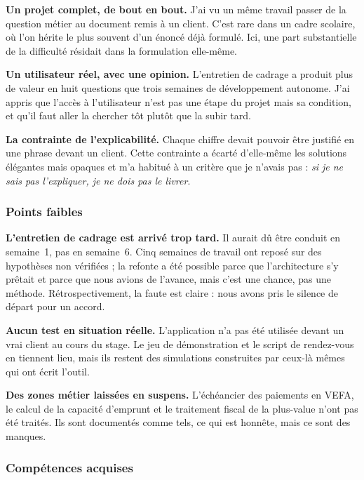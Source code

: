 \documentclass[12pt,a4paper]{article}
\begin{document}
\textbf{Un projet complet, de bout en bout.} J'ai vu un même travail passer de la
question métier au document remis à un client. C'est rare dans un cadre
scolaire, où l'on hérite le plus souvent d'un énoncé déjà formulé. Ici, une part
substantielle de la difficulté résidait dans la formulation elle-même.

\textbf{Un utilisateur réel, avec une opinion.} L'entretien de cadrage a produit
plus de valeur en huit questions que trois semaines de développement autonome.
J'ai appris que l'accès à l'utilisateur n'est pas une étape du projet mais sa
condition, et qu'il faut aller la chercher tôt plutôt que la subir tard.

\textbf{La contrainte de l'explicabilité.} Chaque chiffre devait pouvoir être
justifié en une phrase devant un client. Cette contrainte a écarté d'elle-même
les solutions élégantes mais opaques et m'a habitué à un critère que je n'avais
pas : \emph{si je ne sais pas l'expliquer, je ne dois pas le livrer}.

\subsubsection{Points faibles}

\textbf{L'entretien de cadrage est arrivé trop tard.} Il aurait dû être conduit
en semaine~1, pas en semaine~6. Cinq semaines de travail ont reposé sur des
hypothèses non vérifiées ; la refonte a été possible parce que l'architecture
s'y prêtait et parce que nous avions de l'avance, mais c'est une chance, pas une
méthode. Rétrospectivement, la faute est claire : nous avons pris le silence de
départ pour un accord.

\textbf{Aucun test en situation réelle.} L'application n'a pas été utilisée
devant un vrai client au cours du stage. Le jeu de démonstration et le script de
rendez-vous en tiennent lieu, mais ils restent des simulations construites par
ceux-là mêmes qui ont écrit l'outil.

\textbf{Des zones métier laissées en suspens.} L'échéancier des paiements en
VEFA, le calcul de la capacité d'emprunt et le traitement fiscal de la plus-value
n'ont pas été traités. Ils sont documentés comme tels, ce qui est honnête, mais
ce sont des manques.

\subsubsection{Compétences acquises}
\end{document}
